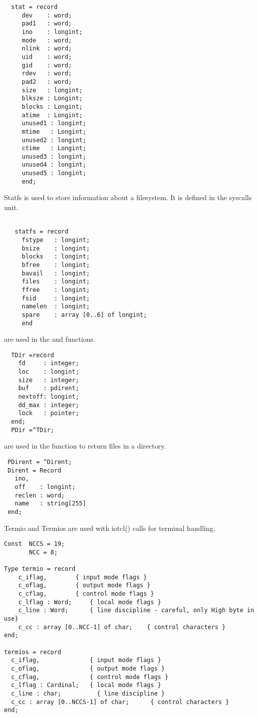 \begin{verbatim}
  stat = record
     dev    : word;
     pad1   : word;
     ino    : longint;
     mode   : word;
     nlink  : word;
     uid    : word;
     gid    : word;
     rdev   : word;
     pad2   : word;
     size   : longint;
     blksze : Longint;
     blocks : Longint;
     atime  : Longint;
     unused1 : longint;
     mtime   : Longint;
     unused2 : longint;
     ctime   : Longint;
     unused3 : longint;
     unused4 : longint;
     unused5 : longint;
     end;
 \end{verbatim}

Statfs is used to store information about a filesystem. It is defined in
the syscalls unit.
\begin{verbatim}

   statfs = record
     fstype   : longint;
     bsize    : longint;
     blocks   : longint;
     bfree    : longint;
     bavail   : longint;
     files    : longint;
     ffree    : longint;
     fsid     : longint;
     namelen  : longint; 
     spare    : array [0..6] of longint;
     end
\end{verbatim}
 are used in the  and 
functions. 
\begin{verbatim}
  TDir =record
    fd     : integer;
    loc    : longint;
    size   : integer;
    buf    : pdirent;
    nextoff: longint;
    dd_max : integer; 
    lock   : pointer;
  end;
  PDir =^TDir;
\end{verbatim}
 are used in the  function to return files in a directory.
\begin{verbatim}
 PDirent = ^Dirent;
 Dirent = Record  
   ino,
   off    : longint;
   reclen : word;
   name   : string[255]
 end; 
\end{verbatim}
Termio and Termios are used with iotcl() calls for terminal handling.
\begin{verbatim}
Const  NCCS = 19;
       NCC = 8;
         
Type termio = record
	c_iflag,		{ input mode flags }
	c_oflag,		{ output mode flags }
	c_cflag,		{ control mode flags }
	c_lflag : Word;		{ local mode flags }
	c_line : Word;		{ line discipline - careful, only High byte in use}
	c_cc : array [0..NCC-1] of char;	{ control characters }
end;

termios = record
  c_iflag,              { input mode flags }
  c_oflag,              { output mode flags }
  c_cflag,              { control mode flags }
  c_lflag : Cardinal;	{ local mode flags }
  c_line : char;          { line discipline }
  c_cc : array [0..NCCS-1] of char;      { control characters }
end;
\end{verbatim}
